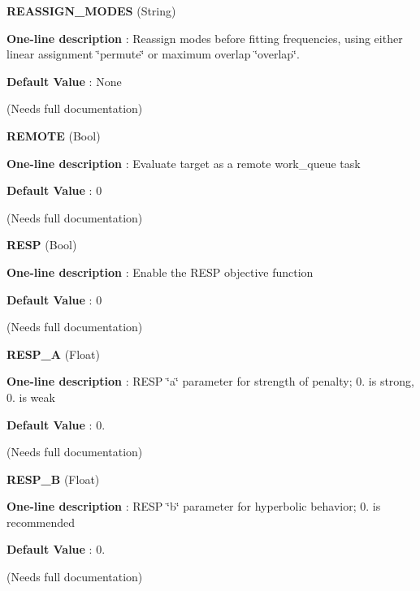 \begin{DoxyItemize}
\item {\bfseries  R\-E\-A\-S\-S\-I\-G\-N\-\_\-\-M\-O\-D\-E\-S } (String) \par
{\bfseries  One-\/line description }\-: Reassign modes before fitting frequencies, using either linear assignment \char`\"{}permute\char`\"{} or maximum overlap \char`\"{}overlap\char`\"{}. \par
{\bfseries  Default Value }\-: None \par
(Needs full documentation)\end{DoxyItemize}
\begin{DoxyItemize}
\item {\bfseries  R\-E\-M\-O\-T\-E } (Bool) \par
{\bfseries  One-\/line description }\-: Evaluate target as a remote work\-\_\-queue task \par
{\bfseries  Default Value }\-: 0 \par
(Needs full documentation)\end{DoxyItemize}
\begin{DoxyItemize}
\item {\bfseries  R\-E\-S\-P } (Bool) \par
{\bfseries  One-\/line description }\-: Enable the R\-E\-S\-P objective function \par
{\bfseries  Default Value }\-: 0 \par
(Needs full documentation)\end{DoxyItemize}
\begin{DoxyItemize}
\item {\bfseries  R\-E\-S\-P\-\_\-\-A } (Float) \par
{\bfseries  One-\/line description }\-: R\-E\-S\-P \char`\"{}a\char`\"{} parameter for strength of penalty; 0. is strong, 0. is weak \par
{\bfseries  Default Value }\-: 0. \par
(Needs full documentation)\end{DoxyItemize}
\begin{DoxyItemize}
\item {\bfseries  R\-E\-S\-P\-\_\-\-B } (Float) \par
{\bfseries  One-\/line description }\-: R\-E\-S\-P \char`\"{}b\char`\"{} parameter for hyperbolic behavior; 0. is recommended \par
{\bfseries  Default Value }\-: 0. \par
(Needs full documentation)\end{DoxyItemize}
